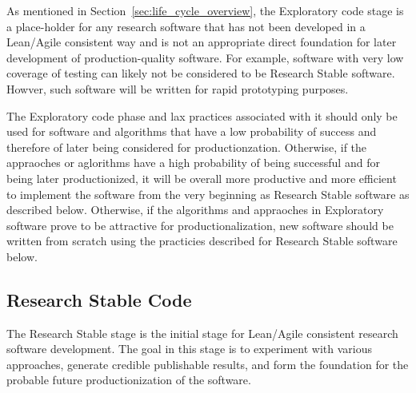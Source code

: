 \documentclass[11pt]{SANDreport}
\begin{document}
As mentioned in Section~\ref{sec:life_cycle_overview}, the Exploratory
code stage is a place-holder for any research software that has not
been developed in a Lean/Agile consistent way and is not an
appropriate direct foundation for later development of
production-quality software.  For example, software with very low
coverage of testing can likely not be considered to be Research Stable
software.  Howver, such software will be written for rapid prototyping
purposes.

The Exploratory code phase and lax practices associated with it should
only be used for software and algorithms that have a low probability
of success and therefore of later being considered for
productionzation.  Otherwise, if the appraoches or aglorithms have a
high probability of being successful and for being later
productionized, it will be overall more productive and more efficient
to implement the software from the very beginning as Research Stable
software as described below.  Otherwise, if the algorithms and
appraoches in Exploratory software prove to be attractive for
productionalization, new software should be written from scratch using
the practicies described for Research Stable software below.


%
{}\subsection{Research Stable Code}
\label{sec:research_stable_code}
%

The Research Stable stage is the initial stage for Lean/Agile
consistent research software development.  The goal in this stage is
to experiment with various approaches, generate credible publishable
results, and form the foundation for the probable future
productionization of the software.
\end{document}
